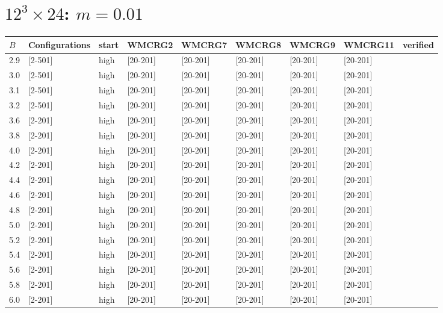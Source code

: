 \documentclass{article}
\begin{document}
  \section*{$12^3\times24$:  $m=0.01$}
    \begin{tabular}{| l | l | l | l | l | l | l | l | l |}
      \hline
      $B$ & Configurations & start & WMCRG2 & WMCRG7 & WMCRG8 & WMCRG9 & WMCRG11 & verified\\
      \hline
      2.9 & [2-501] & high & [20-201] & [20-201] & [20-201] & [20-201] & [20-201] &\\
      3.0 & [2-501] & high & [20-201] & [20-201] & [20-201] & [20-201] & [20-201] &\\
      3.1 & [2-501] & high & [20-201] & [20-201] & [20-201] & [20-201] & [20-201] &\\
      3.2 & [2-501] & high & [20-201] & [20-201] & [20-201] & [20-201] & [20-201] &\\
      3.6 & [2-201] & high & [20-201] & [20-201] & [20-201] & [20-201] & [20-201] &\\
      3.8 & [2-201] & high & [20-201] & [20-201] & [20-201] & [20-201] & [20-201] &\\
      4.0 & [2-201] & high & [20-201] & [20-201] & [20-201] & [20-201] & [20-201] &\\
      4.2 & [2-201] & high & [20-201] & [20-201] & [20-201] & [20-201] & [20-201] &\\
      4.4 & [2-201] & high & [20-201] & [20-201] & [20-201] & [20-201] & [20-201] &\\
      4.6 & [2-201] & high & [20-201] & [20-201] & [20-201] & [20-201] & [20-201] &\\
      4.8 & [2-201] & high & [20-201] & [20-201] & [20-201] & [20-201] & [20-201] &\\
      5.0 & [2-201] & high & [20-201] & [20-201] & [20-201] & [20-201] & [20-201] &\\
      5.2 & [2-201] & high & [20-201] & [20-201] & [20-201] & [20-201] & [20-201] &\\
      5.4 & [2-201] & high & [20-201] & [20-201] & [20-201] & [20-201] & [20-201] &\\
      5.6 & [2-201] & high & [20-201] & [20-201] & [20-201] & [20-201] & [20-201] &\\
      5.8 & [2-201] & high & [20-201] & [20-201] & [20-201] & [20-201] & [20-201] &\\
      6.0 & [2-201] & high & [20-201] & [20-201] & [20-201] & [20-201] & [20-201] &\\

\end{tabular}
\end{document}
